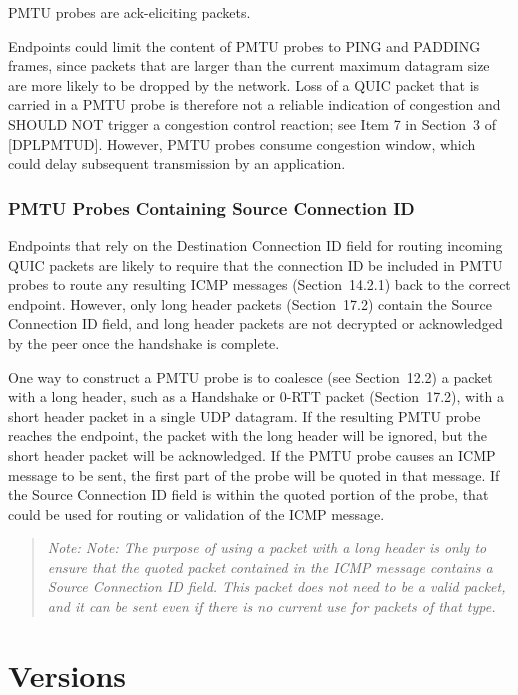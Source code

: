 \documentclass{article}
\begin{document}
PMTU probes are ack-eliciting packets.

Endpoints could limit the content of PMTU probes to PING and PADDING frames, since packets that are larger than the current maximum datagram size are more likely to be dropped by the network.  Loss of a QUIC packet that is carried in a PMTU probe is therefore not a reliable indication of congestion and SHOULD NOT trigger a congestion control reaction; see Item 7 in Section~3 of [DPLPMTUD].  However, PMTU probes consume congestion window, which could delay subsequent transmission by an application.

\subsubsection{PMTU Probes Containing Source Connection ID}

Endpoints that rely on the Destination Connection ID field for routing incoming QUIC packets are likely to require that the connection ID be included in PMTU probes to route any resulting ICMP messages (Section~14.2.1) back to the correct endpoint.  However, only long header packets (Section~17.2) contain the Source Connection ID field, and long header packets are not decrypted or acknowledged by the peer once the handshake is complete.

One way to construct a PMTU probe is to coalesce (see Section~12.2) a packet with a long header, such as a Handshake or 0-RTT packet (Section~17.2), with a short header packet in a single UDP datagram. If the resulting PMTU probe reaches the endpoint, the packet with the long header will be ignored, but the short header packet will be acknowledged.  If the PMTU probe causes an ICMP message to be sent, the first part of the probe will be quoted in that message.  If the Source Connection ID field is within the quoted portion of the probe, that could be used for routing or validation of the ICMP message.

\begin{quote}
\textit{Note: Note: The purpose of using a packet with a long header is only to ensure that the quoted packet contained in the ICMP message contains a Source Connection ID field.  This packet does not need to be a valid packet, and it can be sent even if there is no current use for packets of that type.}
\end{quote}

\section{Versions}
\end{document}
